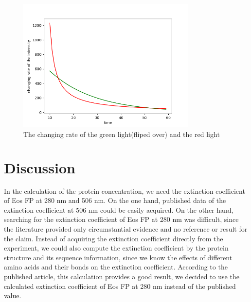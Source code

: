 \documentclass[a4paper,english,12pt,bibliography=totoc]{scrreprt}
\begin{document}
\begin{figure}
    \centering
    \includegraphics[width = 0.8\textwidth]{Figures/changing.png}
    \caption{The changing rate of the green light(fliped over) and the red light}
    \label{fig:enter-label}
\end{figure}
\chapter{Discussion}
\label{cha:Discussion}

In the calculation of the protein concentration, we need the extinction coefficient of Eos FP at 280 nm and 506 nm. On the one hand, published data of the extinction coefficient at 506 nm could be easily acquired\cite{doi:10.1073/pnas.0403668101}. On the other hand, searching for the extinction coefficient of Eos FP at 280 nm was difficult, since the literature provided only circumstantial evidence and no reference or result for the claim. Instead of acquiring the extinction coefficient directly from the experiment, we could also compute the extinction coefficient by the protein structure and its sequence information, since we know the effects of different amino acids and their bonds on the extinction coefficient. According to the published article\cite{extinction_coefficient}, this calculation provides a good result, we decided to use the calculated extinction coefficient of Eos FP at 280 nm instead of the published value.\\
\end{document}
